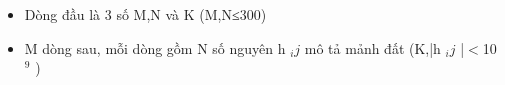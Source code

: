 \begin{itemize}
	\item     Dòng đầu là 3 số M,N và  K (M,N≤300)   
	\item     M dòng sau, mỗi dòng gồm N số nguyên h    $_     ij    $    mô tả mảnh đất (K,|h    $_     ij    $    |$<$10    $^     9    $    )   
\end{itemize}

\